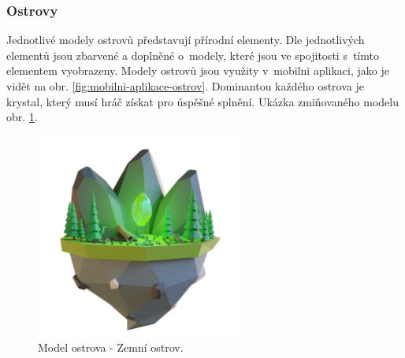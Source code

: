 \subsubsection{Ostrovy}
Jednotlivé modely ostrovů představují přírodní elementy. Dle jednotlivých elementů jsou zbarvené a doplněné o~modely, které jsou ve spojitosti s~tímto elementem vyobrazeny. Modely ostrovů jsou využity v~mobilni aplikaci, jako je vidět na obr. \ref{fig:mobilni-aplikace-ostrov}. Dominantou každého ostrova je krystal, který musí hráč získat pro úspěšné splnění. Ukázka zmiňovaného modelu obr. \ref{fig:nature-island}.

\begin{figure}[h]
    \centering
    \includegraphics[width=0.6\textwidth]{img/NatureIsland.png}
    \caption{Model ostrova - Zemní ostrov.}
    \label{fig:nature-island}
\end{figure}

